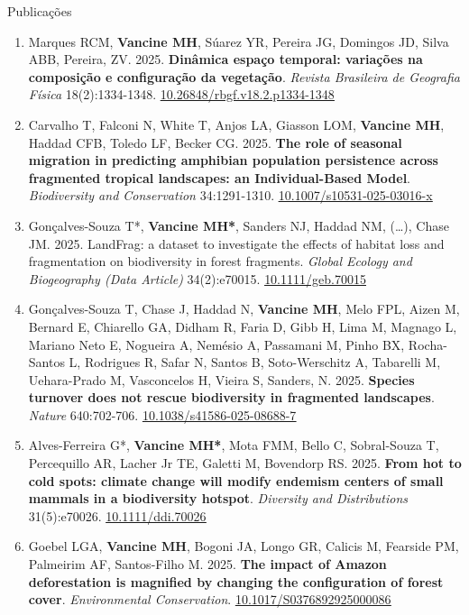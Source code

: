 \documentclass{resume}
\begin{document}
\begin{rSection}{Publicações}
\begin{enumerate}
\item Marques RCM, {\bf Vancine MH}, Súarez YR, Pereira JG, Domingos JD, Silva ABB, Pereira, ZV. 2025. {\bf Dinâmica espaço temporal: variações na composição e configuração da vegetação}. {\it Revista Brasileira de Geografia Física} 18(2):1334-1348. \href{https://doi.org/10.26848/rbgf.v18.2.p1334-1348}{\underline{10.26848/rbgf.v18.2.p1334-1348}}

\item Carvalho T, Falconi N, White T, Anjos LA, Giasson LOM, {\bf Vancine MH}, Haddad CFB, Toledo LF, Becker CG. 2025. {\bf The role of seasonal migration in predicting amphibian population persistence across fragmented tropical landscapes: an Individual-Based Model}. {\it Biodiversity and Conservation} 34:1291-1310. \href{https://doi.org/10.1007/s10531-025-03016-x}{\underline{10.1007/s10531-025-03016-x}}

\item Gonçalves-Souza T*, {\bf Vancine MH*}, Sanders NJ, Haddad NM, (…), Chase JM. 2025. LandFrag: a dataset to investigate the effects of habitat loss and fragmentation on biodiversity in forest fragments. {\it Global Ecology and Biogeography (Data Article)} 34(2):e70015. \href{https://doi.org/10.1111/geb.70015}{\underline{10.1111/geb.70015}}

\item Gonçalves-Souza T, Chase J, Haddad N, {\bf Vancine MH}, Melo FPL, Aizen M, Bernard E, Chiarello GA, Didham R, Faria D, Gibb H, Lima M, Magnago L, Mariano Neto E, Nogueira A, Nemésio A, Passamani M, Pinho BX, Rocha-Santos L, Rodrigues R, Safar N, Santos B, Soto-Werschitz A, Tabarelli M, Uehara-Prado M, Vasconcelos H, Vieira S, Sanders, N. 2025. {\bf Species turnover does not rescue biodiversity in fragmented landscapes}. {\it Nature} 640:702-706. \href{https://doi.org/10.1038/s41586-025-08688-7}{\underline{10.1038/s41586-025-08688-7}}

\item Alves-Ferreira G*, {\bf Vancine MH*}, Mota FMM, Bello C, Sobral-Souza T, Percequillo AR, Lacher Jr TE, Galetti M, Bovendorp RS. 2025. {\bf From hot to cold spots: climate change will modify endemism centers of small mammals in a biodiversity hotspot}. {\it Diversity and Distributions} 31(5):e70026. \href{https://doi.org/10.1111/ddi.70026}{\underline{10.1111/ddi.70026}} 

\item Goebel LGA, {\bf Vancine MH}, Bogoni JA, Longo GR, Calicis M, Fearside PM, Palmeirim AF, Santos-Filho M. 2025. {\bf The impact of Amazon deforestation is magnified by changing the configuration of forest cover}. {\it Environmental Conservation}. \href{https://doi.org/10.1017/S0376892925000086}{\underline{10.1017/S0376892925000086}}


\end{enumerate}
\end{rSection}
\end{document}
